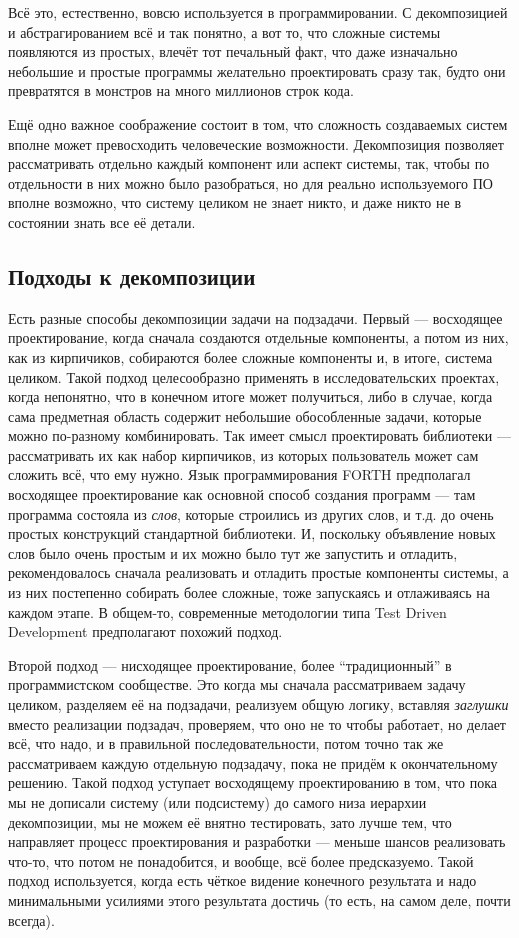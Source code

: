 \documentclass[a5paper]{article}
\begin{document}
Всё это, естественно, вовсю используется в программировании. С декомпозицией и абстрагированием всё и так понятно, а вот то, что сложные системы появляются из простых, влечёт тот печальный факт, что даже изначально небольшие и простые программы желательно проектировать сразу так, будто они превратятся в монстров на много миллионов строк кода.

Ещё одно важное соображение состоит в том, что сложность создаваемых систем вполне может превосходить человеческие возможности. Декомпозиция позволяет рассматривать отдельно каждый компонент или аспект системы, так, чтобы по отдельности в них можно было разобраться, но для реально используемого ПО вполне возможно, что систему целиком не знает никто, и даже никто не в состоянии знать все её детали.

\subsection{Подходы к декомпозиции}

Есть разные способы декомпозиции задачи на подзадачи. Первый --- восходящее проектирование, когда сначала создаются отдельные компоненты, а потом из них, как из кирпичиков, собираются более сложные компоненты и, в итоге, система целиком. Такой подход целесообразно применять в исследовательских проектах, когда непонятно, что в конечном итоге может получиться, либо в случае, когда сама предметная область содержит небольшие обособленные задачи, которые можно по-разному комбинировать. Так имеет смысл проектировать библиотеки --- рассматривать их как набор кирпичиков, из которых пользователь может сам сложить всё, что ему нужно. Язык программирования FORTH предполагал восходящее проектирование как основной способ создания программ --- там программа состояла из \textit{слов}, которые строились из других слов, и т.д. до очень простых конструкций стандартной библиотеки. И, поскольку объявление новых слов было очень простым и их можно было тут же запустить и отладить, рекомендовалось сначала реализовать и отладить простые компоненты системы, а из них постепенно собирать более сложные, тоже запускаясь и отлаживаясь на каждом этапе. В общем-то, современные методологии типа Test Driven Development предполагают похожий подход.

Второй подход --- нисходящее проектирование, более ``традиционный'' в программистском сообществе. Это когда мы сначала рассматриваем задачу целиком, разделяем её на подзадачи, реализуем общую логику, вставляя \textit{заглушки} вместо реализации подзадач, проверяем, что оно не то чтобы работает, но делает всё, что надо, и в правильной последовательности, потом точно так же рассматриваем каждую отдельную подзадачу, пока не придём к окончательному решению. Такой подход уступает восходящему проектированию в том, что пока мы не дописали систему (или подсистему) до самого низа иерархии декомпозиции, мы не можем её внятно тестировать, зато лучше тем, что направляет процесс проектирования и разработки --- меньше шансов реализовать что-то, что потом не понадобится, и вообще, всё более предсказуемо. Такой подход используется, когда есть чёткое видение конечного результата и надо минимальными усилиями этого результата достичь (то есть, на самом деле, почти всегда).
\end{document}
